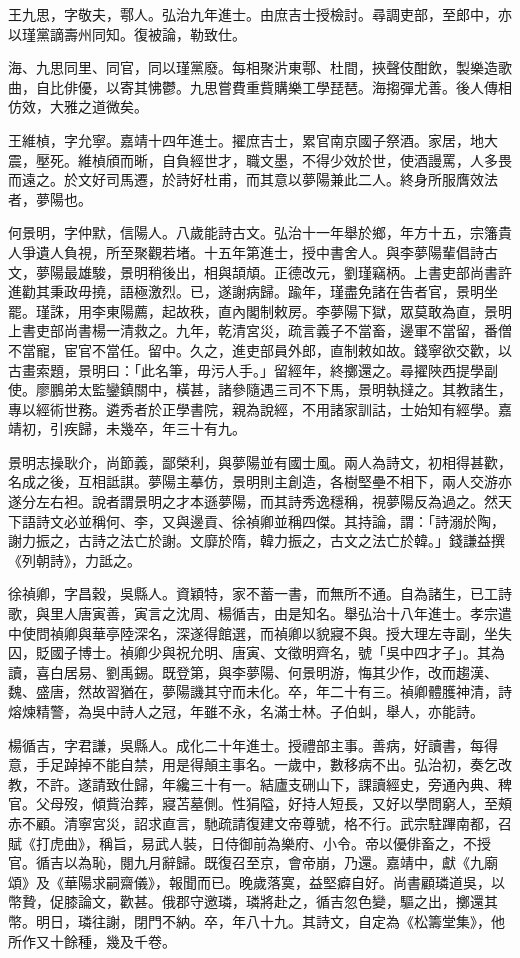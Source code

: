 \begin{pinyinscope}
王九思，字敬夫，鄠人。弘治九年進士。由庶吉士授檢討。尋調吏部，至郎中，亦以瑾黨謫壽州同知。復被論，勒致仕。

海、九思同里、同官，同以瑾黨廢。每相聚沜東鄠、杜間，挾聲伎酣飲，製樂造歌曲，自比俳優，以寄其怫鬱。九思嘗費重貲購樂工學琵琶。海搊彈尤善。後人傳相仿效，大雅之道微矣。

王維楨，字允寧。嘉靖十四年進士。擢庶吉士，累官南京國子祭酒。家居，地大震，壓死。維楨頎而晰，自負經世才，職文墨，不得少效於世，使酒謾罵，人多畏而遠之。於文好司馬遷，於詩好杜甫，而其意以夢陽兼此二人。終身所服膺效法者，夢陽也。

何景明，字仲默，信陽人。八歲能詩古文。弘治十一年舉於鄉，年方十五，宗籓貴人爭遺人負視，所至聚觀若堵。十五年第進士，授中書舍人。與李夢陽輩倡詩古文，夢陽最雄駿，景明稍後出，相與頡頏。正德改元，劉瑾竊柄。上書吏部尚書許進勸其秉政毋撓，語極激烈。已，遂謝病歸。踰年，瑾盡免諸在告者官，景明坐罷。瑾誅，用李東陽薦，起故秩，直內閣制敕房。李夢陽下獄，眾莫敢為直，景明上書吏部尚書楊一清救之。九年，乾清宮災，疏言義子不當畜，邊軍不當留，番僧不當寵，宦官不當任。留中。久之，進吏部員外郎，直制敕如故。錢寧欲交歡，以古畫索題，景明曰：「此名筆，毋污人手。」留經年，終擲還之。尋擢陜西提學副使。廖鵬弟太監鑾鎮關中，橫甚，諸參隨遇三司不下馬，景明執撻之。其教諸生，專以經術世務。遴秀者於正學書院，親為說經，不用諸家訓詁，士始知有經學。嘉靖初，引疾歸，未幾卒，年三十有九。

景明志操耿介，尚節義，鄙榮利，與夢陽並有國士風。兩人為詩文，初相得甚歡，名成之後，互相詆諆。夢陽主摹仿，景明則主創造，各樹堅壘不相下，兩人交游亦遂分左右袒。說者謂景明之才本遜夢陽，而其詩秀逸穩稱，視夢陽反為過之。然天下語詩文必並稱何、李，又與邊貢、徐禎卿並稱四傑。其持論，謂：「詩溺於陶，謝力振之，古詩之法亡於謝。文靡於隋，韓力振之，古文之法亡於韓。」錢謙益撰《列朝詩》，力詆之。

徐禎卿，字昌穀，吳縣人。資穎特，家不蓄一書，而無所不通。自為諸生，已工詩歌，與里人唐寅善，寅言之沈周、楊循吉，由是知名。舉弘治十八年進士。孝宗遣中使問禎卿與華亭陸深名，深遂得館選，而禎卿以貌寢不與。授大理左寺副，坐失囚，貶國子博士。禎卿少與祝允明、唐寅、文徵明齊名，號「吳中四才子」。其為讀，喜白居易、劉禹錫。既登第，與李夢陽、何景明游，悔其少作，改而趨漢、魏、盛唐，然故習猶在，夢陽譏其守而未化。卒，年二十有三。禎卿體臒神清，詩熔煉精警，為吳中詩人之冠，年雖不永，名滿士林。子伯虯，舉人，亦能詩。

楊循吉，字君謙，吳縣人。成化二十年進士。授禮部主事。善病，好讀書，每得意，手足踔掉不能自禁，用是得顛主事名。一歲中，數移病不出。弘治初，奏乞改教，不許。遂請致仕歸，年纔三十有一。結廬支硎山下，課讀經史，旁通內典、稗官。父母歿，傾貲治葬，寢苫墓側。性狷隘，好持人短長，又好以學問窮人，至頰赤不顧。清寧宮災，詔求直言，馳疏請復建文帝尊號，格不行。武宗駐蹕南都，召賦《打虎曲》，稱旨，易武人裝，日侍御前為樂府、小令。帝以優俳畜之，不授官。循吉以為恥，閱九月辭歸。既復召至京，會帝崩，乃還。嘉靖中，獻《九廟頌》及《華陽求嗣齋儀》，報聞而已。晚歲落寞，益堅癖自好。尚書顧璘道吳，以幣贄，促膝論文，歡甚。俄郡守邀璘，璘將赴之，循吉忽色變，驅之出，擲還其幣。明日，璘往謝，閉門不納。卒，年八十九。其詩文，自定為《松籌堂集》，他所作又十餘種，幾及千卷。


\end{pinyinscope}
